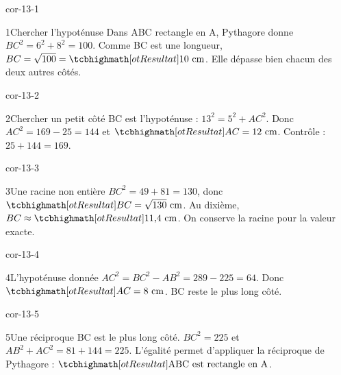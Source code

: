 \clearpage\pagestyle{otMain}\setlength{\otBlocEspacement}{2.5mm}\fontsize{11}{15}\selectfont{}
\begin{blocLivre}{cor-13-1}\begin{corrige}{1}{Chercher l’hypoténuse}
Dans ABC rectangle en A, Pythagore donne $BC^2=6^2+8^2=100$. Comme BC est une longueur, $BC=\sqrt{100}=\res{10\ \mathrm{cm}}$. Elle dépasse bien chacun des deux autres côtés.
\label{fig-cor-13-1}
\end{corrige}\end{blocLivre}
\begin{blocLivre}{cor-13-2}\begin{corrige}{2}{Chercher un petit côté}
BC est l’hypoténuse : $13^2=5^2+AC^2$. Donc $AC^2=169-25=144$ et $\res{AC=12\ \mathrm{cm}}$. Contrôle : $25+144=169$.
\label{fig-cor-13-2}
\end{corrige}\end{blocLivre}
\begin{blocLivre}{cor-13-3}\begin{corrige}{3}{Une racine non entière}
$BC^2=49+81=130$, donc $\res{BC=\sqrt{130}\ \mathrm{cm}}$. Au dixième, $BC\approx\res{11{,}4\ \mathrm{cm}}$. On conserve la racine pour la valeur exacte.
\label{fig-cor-13-3}
\end{corrige}\end{blocLivre}
\begin{blocLivre}{cor-13-4}\begin{corrige}{4}{L’hypoténuse donnée}
$AC^2=BC^2-AB^2=289-225=64$. Donc $\res{AC=8\ \mathrm{cm}}$. BC reste le plus long côté.
\label{fig-cor-13-4}
\end{corrige}\end{blocLivre}
\begin{blocLivre}{cor-13-5}\begin{corrige}{5}{Une réciproque}
BC est le plus long côté. $BC^2=225$ et $AB^2+AC^2=81+144=225$. L’égalité permet d’appliquer la réciproque de Pythagore : $\res{\text{ABC est rectangle en A}}$.
\label{fig-cor-13-5}
\end{corrige}\end{blocLivre}
